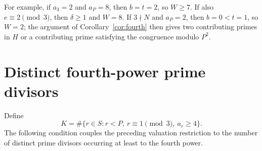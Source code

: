 \documentclass[11pt]{article}
\theoremstyle{remark}
\begin{document}
For example, if $a_3=2$ and $a_P=8$, then $b=t=2$, so $W\ge7$.
If also $e\equiv2\pmod3$, then $\delta\ge1$ and $W=8$.
If $3\nmid N$ and $a_P=2$, then $b=0<t=1$, so $W=2$; the argument of
Corollary~\ref{cor:fourth} then gives two contributing primes in $H$ or a
contributing prime satisfying the congruence modulo $P^2$.

\section{Distinct fourth-power prime divisors}\label{sec:fourthcount}

Define
\[
 K=\#\{r\in S:r<P,\ r\equiv1\pmod3,\ a_r\ge4\}.
\]
The following condition couples the preceding valuation restriction to the
number of distinct prime divisors occurring at least to the fourth power.
\end{document}

